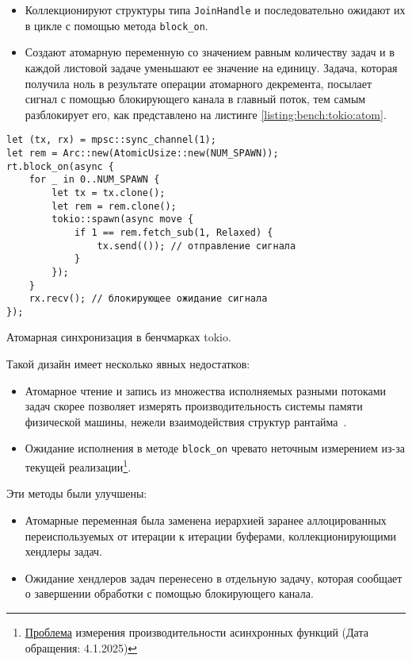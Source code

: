 \begin{itemize}
    \item Коллекционируют структуры типа \verb|JoinHandle| и последовательно ожидают их в цикле с помощью метода \verb|block_on|.
    \item Создают атомарную переменную со значением равным количеству задач и в каждой листовой задаче уменьшают ее значение на единицу. Задача, которая получила ноль в результате операции атомарного декремента, посылает сигнал с помощью блокирующего канала в главный поток, тем самым разблокирует его, как представлено на листинге \ref{listing:bench:tokio:atom}.
\end{itemize}

\begin{listing}[H]
    \begin{verbatim}
let (tx, rx) = mpsc::sync_channel(1);
let rem = Arc::new(AtomicUsize::new(NUM_SPAWN));
rt.block_on(async {
    for _ in 0..NUM_SPAWN {
        let tx = tx.clone();
        let rem = rem.clone();
        tokio::spawn(async move {
            if 1 == rem.fetch_sub(1, Relaxed) {
                tx.send(()); // отправление сигнала
            }
        });
    }
    rx.recv(); // блокирующее ожидание сигнала
});
    \end{verbatim}

    \caption{Атомарная синхронизация в бенчмарках tokio.}
    \label{listing:bench:tokio:atom}
\end{listing}

Такой дизайн имеет несколько явных недостатков:

\begin{itemize}
    \item Атомарное чтение и запись из множества исполняемых разными потоками задач скорее позволяет измерять производительность системы памяти физической машины, нежели взаимодействия структур рантайма~\cite{atomicOnModerHardware}.
    \item Ожидание исполнения в методе \verb|block_on| чревато неточным измерением из-за текущей реализации\footnote{\href{https://github.com/bheisler/criterion.rs/issues/819}{Проблема} измерения производительности асинхронных функций (Дата обращения: 4.1.2025)}.
\end{itemize}

Эти методы были улучшены:

\begin{itemize}
    \item Атомарные переменная была заменена иерархией заранее аллоцированных переиспользуемых от итерации к итерации буферами, коллекционирующими хендлеры задач.
    \item Ожидание хендлеров задач перенесено в отдельную задачу, которая сообщает о завершении обработки с помощью блокирующего канала.
\end{itemize}

